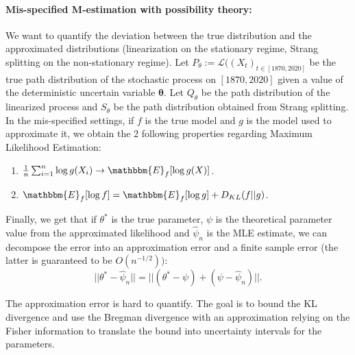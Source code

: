 \documentclass[12pt,a4paper]{article}
\theoremstyle{definition}
\theoremstyle{plain}
\begin{document}
\newpage



\paragraph{Mis-specified M-estimation with possibility theory:} 


We want to quantify the deviation between the true distribution and the approximated distributions (linearization on the stationary regime, Strang splitting on the non-stationary regime). Let $P_\theta := \mathcal{L}((X_t)_{t \in [1870, 2020]}$ be the true path distribution of the stochastic process on $[1870, 2020]$ given a value of the deterministic uncertain variable $\bm{\theta}$. Let $Q_\theta$ be the path distribution of the linearized process and $S_\theta$ be the path distribution obtained from Strang splitting. \\


\noindent In the mis-specified settings, if $f$ is the true model and $g$ is the model used to approximate it, we obtain the 2 following properties regarding Maximum Likelihood Estimation:
\begin{enumerate}
    \item $\frac{1}{n}\sum_{i=1}^{n} \log g(X_i) \to  \mathbbm{E}_f[\log g(X)]$.
    \item $\mathbbm{E}_f[\log f] = \mathbbm{E}_f[\log g] + D_{KL}(f || g)$. \\
\end{enumerate}

\noindent Finally, we get that if $\theta^*$ is the true parameter, $\psi$ is the theoretical parameter value from the approximated likelihood and $\hat{\psi}_n$ is the MLE estimate, we can decompose the error into an approximation error and a finite sample error (the latter is guaranteed to be $O(n^{-1/2}))$:
$$
|| \theta^* - \hat{\psi}_n|| = || (\theta^* - \psi) + (\psi - \hat{\psi}_n)||.
$$

\noindent The approximation error is hard to quantify. The goal is to bound the KL divergence and use the Bregman divergence with an approximation relying on the Fisher information to translate the bound into uncertainty intervals for the parameters. \\
\end{document}
